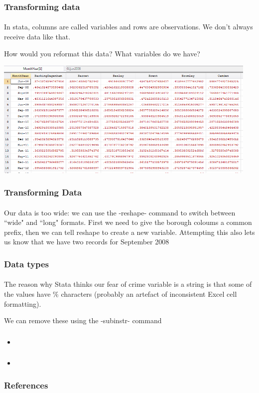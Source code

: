 \documentclass{beamer}
\begin{document}
\begin{frame}
  \frametitle{Transforming data}
  \framesubtitle{}
In stata, columns are called variables and rows are observations. We don't always receive data like that.

\smallskip

How would you reformat this data? What variables do we have?

\includegraphics[width=5in]{data.PNG}
\end{frame}

\begin{frame}
  \frametitle{Transforming Data}
  \framesubtitle{}
Our data is too wide: we can use the -reshape- command to switch between ``wide" and ``long" formats. First we need to give the borough coloums a common prefix, then we can tell reshape to create a new variable. Attempting this also lets us know that we have two records for September 2008




\end{frame}






\begin{frame}
  \frametitle{Data types}
  \framesubtitle{}
The reason why Stata thinks our fear of crime variable is a string is that some of the values have \% characters (probably an artefact of inconsistent Excel cell formatting).

\smallskip

We can remove these using the -subinstr- command


\end{frame}

\begin{frame}
  \frametitle{}
  \framesubtitle{}
  \begin{itemize}
    \item 
  \end{itemize}
\end{frame}

\begin{frame}
  \frametitle{}
  \framesubtitle{}
  \begin{itemize}
    \item 
  \end{itemize}
\end{frame}

\begin{frame}
  \frametitle{References}


\end{frame}
\end{document}
